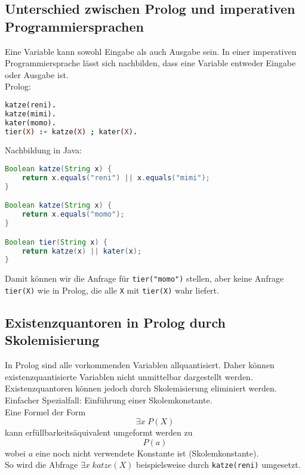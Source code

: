 \subsection{Unterschied zwischen Prolog und imperativen Programmiersprachen}
Eine Variable kann sowohl Eingabe als auch Ausgabe sein. In einer imperativen Programmiersprache lässt sich nachbilden, dass eine Variable entweder Eingabe oder Ausgabe ist.\\
Prolog:
\begin{lstlisting}[language=Prolog]
katze(reni).
katze(mimi).
kater(momo).
tier(X) :- katze(X) ; kater(X).
\end{lstlisting}
Nachbildung in Java:
\begin{lstlisting}[language=Java]
Boolean katze(String x) {
	return x.equals("reni") || x.equals("mimi");
}

Boolean katze(String x) {
	return x.equals("momo");
}

Boolean tier(String x) {
	return katze(x) || kater(x);
}
\end{lstlisting}
Damit können wir die Anfrage für \lstinline$tier("momo")$ stellen, aber keine Anfrage \lstinline$tier(X)$ wie in Prolog, die alle \lstinline$X$ mit \lstinline$tier(X)$ wahr liefert.

\subsection{Existenzquantoren in Prolog durch Skolemisierung}
In Prolog sind alle vorkommenden Variablen allquantisiert. Daher können existenzquantisierte Variablen nicht unmittelbar dargestellt werden. Existenzquantoren können jedoch durch Skolemisierung eliminiert werden. Einfacher Spezialfall: Einführung einer Skolemkonstante.\\
Eine Formel der Form
$$\exists x\; P(X)$$
kann erfüllbarkeitsäquivalent umgeformt werden zu
$$P(a)$$
wobei $a$ eine noch nicht verwendete Konstante ist (Skolemkonstante).\\
So wird die Abfrage $\exists x\; katze(X)$ beispielsweise durch \lstinline$katze(reni)$ umgesetzt.

